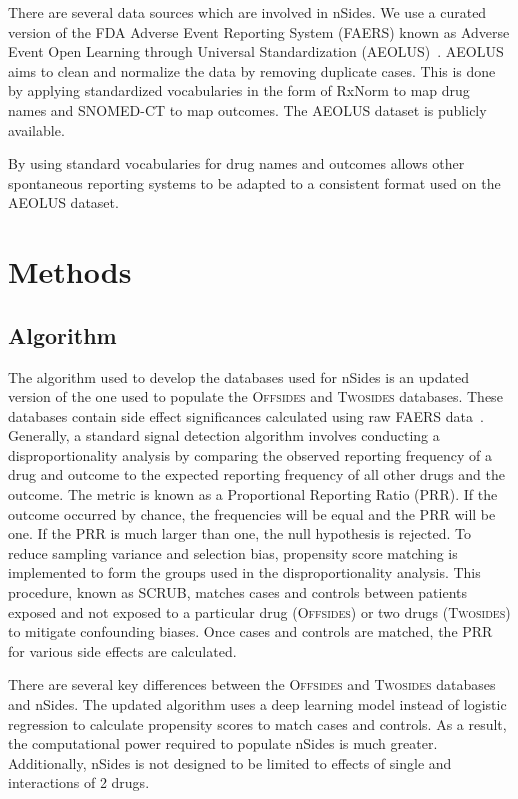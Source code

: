 \documentclass{ws-procs11x85}
\begin{document}
There are several data sources which are involved in nSides. We use a
curated version of the FDA Adverse Event Reporting System (FAERS)
known as Adverse Event Open Learning through Universal Standardization
(AEOLUS)~\cite{AEOLUS}.  AEOLUS aims to clean and normalize the data
by removing duplicate cases. This is done by applying standardized
vocabularies in the form of RxNorm to map drug names and SNOMED-CT to
map outcomes. The AEOLUS dataset is publicly available.

By using standard vocabularies for drug names and outcomes allows
other spontaneous reporting systems to be adapted to a consistent
format used on the AEOLUS dataset.

\section{Methods}

\subsection{Algorithm}
The algorithm used to develop the databases used for nSides is an
updated version of the one used to populate the O\textsc{ffsides} and
T\textsc{wosides} databases.  These databases contain side effect
significances calculated using raw FAERS data~\cite{Tatonetti2012}.
Generally, a standard signal detection algorithm involves conducting a
disproportionality analysis by comparing the observed reporting
frequency of a drug and outcome to the expected reporting frequency of
all other drugs and the outcome. The metric is known as a Proportional
Reporting Ratio (PRR). If the outcome occurred by chance, the
frequencies will be equal and the PRR will be one. If the PRR is much
larger than one, the null hypothesis is rejected. To reduce sampling
variance and selection bias, propensity score matching is implemented
to form the groups used in the disproportionality analysis. This
procedure, known as SCRUB, matches cases and controls between patients
exposed and not exposed to a particular drug (O\textsc{ffsides}) or
two drugs (T\textsc{wosides}) to mitigate confounding biases. Once
cases and controls are matched, the PRR for various side effects are
calculated.

There are several key differences between the O\textsc{ffsides} and
T\textsc{wosides} databases and nSides. The updated algorithm uses a
deep learning model instead of logistic regression to calculate
propensity scores to match cases and controls. As a result, the
computational power required to populate nSides is much
greater. Additionally, nSides is not designed to be limited to
effects of single and interactions of 2 drugs.
\end{document}
